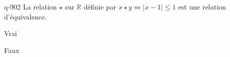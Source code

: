 \begin{truefalse}{q-902}
La relation $\star$ sur $\mathbb R$ définie par $x\star y \iff |x-1|\leq 1$ est une relation d'équivalence.
\item Vrai
\item* Faux
\end{truefalse}

